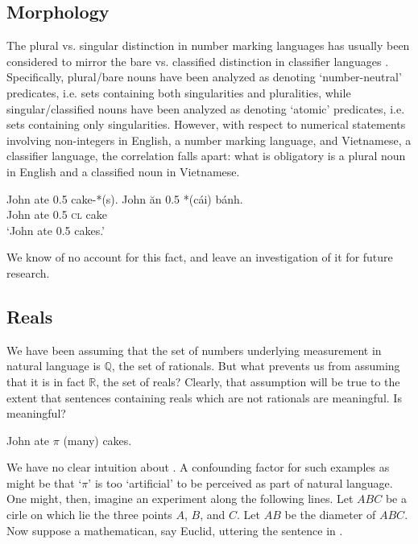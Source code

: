 \documentclass[output=paper]{langscibook}
\begin{document}
\subsection{Morphology} 

The plural vs. singular distinction in number marking languages has usually been considered to mirror the bare vs. classified distinction in classifier languages \citep[cf.][]{Chierchia:1998, cheng1999bare}. Specifically, plural/bare nouns have been analyzed as denoting `number-neutral' predicates, i.e. sets containing both singularities and pluralities, while singular/classified nouns have been analyzed as denoting `atomic' predicates, i.e. sets containing only singularities. However, with respect to numerical statements involving non-integers in English, a number marking language, and Vietnamese, a classifier language, the correlation falls apart: what is obligatory is a plural noun in English and a classified noun in Vietnamese.

\ea
\ea John ate 0.5 cake-*(s).
\ex \gll John ăn 0.5 *(cái) bánh.\\
         John ate 0.5 \textsc{cl} cake\\
    \glt `John ate 0.5 cakes.'     
\z
\z

\noindent We know of no account for this fact, and leave an investigation of it for future research. 

\subsection{Reals}\label{hai-tri:sec:reals}

We have been assuming that the set of numbers underlying measurement in natural language is $\mathbb{Q}$, the set of rationals. But what prevents us from assuming that it is in fact $\mathbb{R}$, the set of reals? Clearly, that assumption will be true to the extent that sentences containing reals which are not rationals are meaningful. Is  meaningful?

\ea
John ate $\pi$ (many) cakes.
\label{hai-tri:pi}
\z

\noindent We have no clear intuition about . A confounding factor for such examples as  might be that `$\pi$' is too `artificial' to be perceived as part of natural language. One might, then, imagine an experiment along the following lines. Let $ABC$ be a cirle on which lie the three points $A$, $B$, and $C$. Let $AB$ be the diameter of $ABC$. Now suppose a mathematican, say Euclid, uttering the sentence in .
\end{document}
